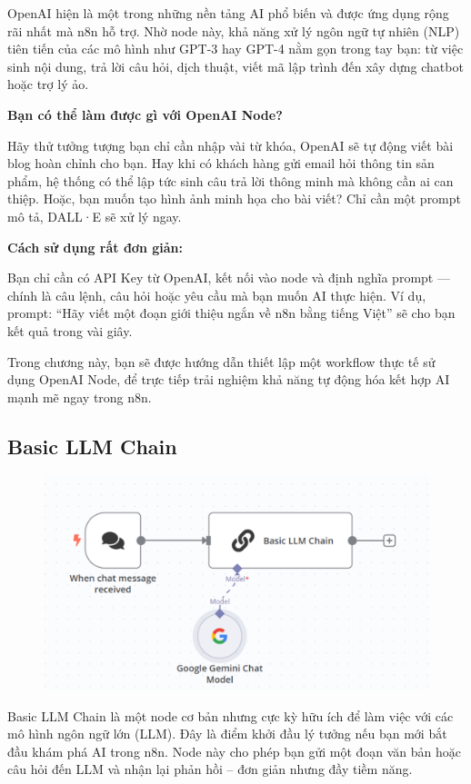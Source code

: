 OpenAI hiện là một trong những nền tảng AI phổ biến và được ứng dụng rộng rãi nhất mà n8n hỗ trợ. Nhờ node này, khả năng xử lý ngôn ngữ tự nhiên (NLP) tiên tiến của các mô hình như GPT-3 hay GPT-4 nằm gọn trong tay bạn: từ việc sinh nội dung, trả lời câu hỏi, dịch thuật, viết mã lập trình đến xây dựng chatbot hoặc trợ lý ảo.

\textbf{Bạn có thể làm được gì với OpenAI Node?}

Hãy thử tưởng tượng bạn chỉ cần nhập vài từ khóa, OpenAI sẽ tự động viết bài blog hoàn chỉnh cho bạn. Hay khi có khách hàng gửi email hỏi thông tin sản phẩm, hệ thống có thể lập tức sinh câu trả lời thông minh mà không cần ai can thiệp. Hoặc, bạn muốn tạo hình ảnh minh họa cho bài viết? Chỉ cần một prompt mô tả, DALL·E sẽ xử lý ngay.

\textbf{Cách sử dụng rất đơn giản:}

Bạn chỉ cần có API Key từ OpenAI, kết nối vào node và định nghĩa prompt — chính là câu lệnh, câu hỏi hoặc yêu cầu mà bạn muốn AI thực hiện. Ví dụ, prompt: “Hãy viết một đoạn giới thiệu ngắn về n8n bằng tiếng Việt” sẽ cho bạn kết quả trong vài giây.

Trong chương này, bạn sẽ được hướng dẫn thiết lập một workflow thực tế sử dụng OpenAI Node, để trực tiếp trải nghiệm khả năng tự động hóa kết hợp AI mạnh mẽ ngay trong n8n.



\newpage
\subsection{Basic LLM Chain}
\begin{figure}[htbp]
    \centering
    \includegraphics[width=1\linewidth]{Chap1-7/basic_llm.pdf}
\end{figure}
Basic LLM Chain là một node cơ bản nhưng cực kỳ hữu ích để làm việc với các mô hình ngôn ngữ lớn (LLM). Đây là điểm khởi đầu lý tưởng nếu bạn mới bắt đầu khám phá AI trong n8n. Node này cho phép bạn gửi một đoạn văn bản hoặc câu hỏi đến LLM và nhận lại phản hồi – đơn giản nhưng đầy tiềm năng.

